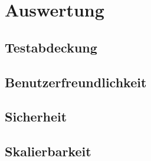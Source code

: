 \chapter{Auswertung}
\label{chap:auswertung}

\section{Testabdeckung}
\label{sec:testabdeckung}

\section{Benutzerfreundlichkeit}
\label{sec:benutzerfreundlichkeit}

\section{Sicherheit}
\label{sec:sicherheit}

\section{Skalierbarkeit}
\label{sec:skalierbarkeit}
